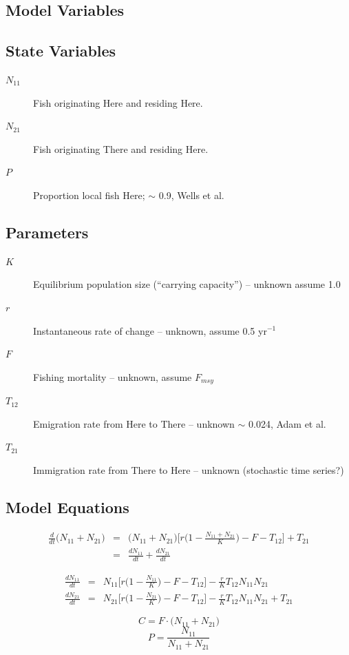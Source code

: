 \documentclass[a4paper,KOMA,landscape,titlepage]{powersem}
\newcommand\None{{N_{11}}}
\newcommand\Ntwo{{N_{21}}}
\newcommand\Nsum{{N_{11}+N_{21}}}
\begin{document}
\begin{slide}\section{Model Variables}
\subsection{State Variables}
\begin{description}
\item[$N_{11}$]Fish originating Here and residing Here.
\item[$N_{21}$]Fish originating There and residing Here.
\item[$P$]Proportion local fish Here; $\sim$ 0.9, Wells et al.
\end{description}
\subsection{Parameters}
\begin{description}
\item[$K$]Equilibrium population size (``carrying capacity'') -- unknown assume 1.0
\item[$r$]Instantaneous rate of change -- unknown, assume 0.5 yr$^{-1}$
\item[$F$]Fishing mortality -- unknown, assume $F_{msy}$
\item[$T_{12}$]Emigration rate from Here to There -- unknown $\sim$ 0.024, Adam et al.
\item[$T_{21}$]Immigration rate from There to Here -- unknown
(stochastic time series?)
\end{description}
\end{slide}

\begin{slide}\section{Model Equations}
\begin{eqnarray}
\frac{d}{dt}\big(\Nsum\big)&=&\big(\Nsum\big)\Big[r\Big(1-\frac{\Nsum}{K}\Big)
-F - T_{12}\Big] + T_{21}\\
&=&\frac{d\None}{dt} + \frac{d\Ntwo}{dt}\nonumber
\label{eqn:basic}
\end{eqnarray}

\begin{eqnarray}
\frac{d\None}{dt}&=&\None\Big[r\Big(1-\frac{\None}{K}\Big)
-F - T_{12}\Big] - \frac{r}{K}T_{12}\None\Ntwo\\
\frac{d\Ntwo}{dt}&=&\Ntwo\Big[r\Big(1-\frac{\Ntwo}{K}\Big)
-F - T_{12}\Big] - \frac{r}{K}T_{12}\None\Ntwo + T_{21}
\end{eqnarray}

\begin{equation}
C=F\cdot\big(N_{11}+N_{21}\big)
\end{equation}
\begin{equation}
P=\frac{N_{11}}{N_{11}+N_{21}}
\end{equation}
\end{slide}
\end{document}
